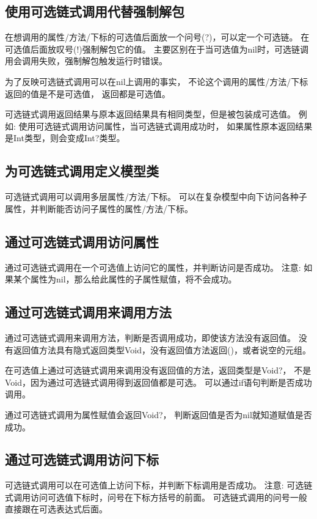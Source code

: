 \documentclass{../main.tex}{subfiles}
\begin{document}
\subsection{使用可选链式调用代替强制解包}
在想调用的属性/方法/下标的可选值后面放一个问号(?)，可以定一个可选链。
在可选值后面放叹号(!)强制解包它的值。
主要区别在于当可选值为nil时，可选链调用会调用失败，强制解包触发运行时错误。

为了反映可选链式调用可以在nil上调用的事实，
    不论这个调用的属性/方法/下标返回的值是不是可选值，
    返回都是可选值。

可选链式调用返回结果与原本返回结果具有相同类型，但是被包装成可选值。
例如: 使用可选链式调用访问属性，当可选链式调用成功时，
    如果属性原本返回结果是Int类型，则会变成Int?类型。

\subsection{为可选链式调用定义模型类}
可选链式调用可以调用多层属性/方法/下标。
可以在复杂模型中向下访问各种子属性，并判断能否访问子属性的属性/方法/下标。

\subsection{通过可选链式调用访问属性}
通过可选链式调用在一个可选值上访问它的属性，并判断访问是否成功。
注意: 如果某个属性为nil，那么给此属性的子属性赋值，将不会成功。

\subsection{通过可选链式调用来调用方法}
通过可选链式调用来调用方法，判断是否调用成功，即使该方法没有返回值。
没有返回值方法具有隐式返回类型Void，没有返回值方法返回()，或者说空的元组。

在可选值上通过可选链式调用来调用没有返回值的方法，返回类型是Void?，
不是Void，因为通过可选链式调用得到返回值都是可选。
可以通过if语句判断是否成功调用。

通过可选链式调用为属性赋值会返回Void?， 判断返回值是否为nil就知道赋值是否成功。

\subsection{通过可选链式调用访问下标}
可选链式调用可以在可选值上访问下标，并判断下标调用是否成功。
注意: 可选链式调用访问可选值下标时，问号在下标方括号的前面。
可选链式调用的问号一般直接跟在可选表达式后面。
\end{document}
